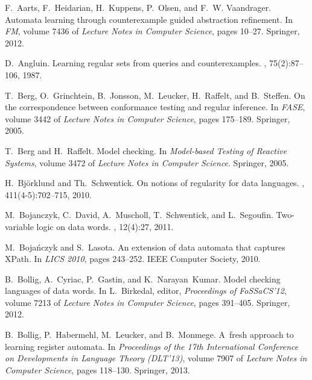 \documentclass{LMCS}
\begin{document}
\def\Nst#1{$#1^{st}$}\def\Nnd#1{$#1^{nd}$}\def\Nrd#1{$#1^{rd}$}\def\Nth#1{$#1^{th}$}
\begin{thebibliography}{10}

F.~Aarts, F.~Heidarian, H.~Kuppens, P.~Olsen, and F.~W. Vaandrager.
\newblock Automata learning through counterexample guided abstraction
  refinement.
\newblock In {\em FM}, volume 7436 of {\em Lecture Notes in Computer Science},
  pages 10--27. Springer, 2012.

D.~Angluin.
\newblock Learning regular sets from queries and counterexamples.
, 75(2):87--106, 1987.

T.~Berg, O.~Grinchtein, B.~Jonsson, M.~Leucker, H.~Raffelt, and B.~Steffen.
\newblock On the correspondence between conformance testing and regular
  inference.
\newblock In {\em FASE}, volume 3442 of {\em Lecture Notes in Computer
  Science}, pages 175--189. Springer, 2005.

T.~Berg and H.~Raffelt.
\newblock Model checking.
\newblock In {\em Model-based Testing of Reactive Systems}, volume 3472 of {\em
  Lecture Notes in Computer Science}. Springer, 2005.

H.~Bj{\"o}rklund and {\relax Th}.~Schwentick.
\newblock On notions of regularity for data languages.
, 411(4-5):702--715, 2010.

M.~Bojanczyk, C.~David, A.~Muscholl, T.~Schwentick, and L.~Segoufin.
\newblock Two-variable logic on data words.
, 12(4):27, 2011.

M.~Boja{\'n}czyk and S.~Lasota.
\newblock An extension of data automata that captures {XPath}.
\newblock In {\em {LICS 2010}}, pages 243--252. IEEE Computer Society, 2010.

B.~Bollig, A.~Cyriac, P.~Gastin, and K.~Narayan~Kumar.
\newblock Model checking languages of data words.
\newblock In L.~Birkedal, editor, {\em {P}roceedings of {FoSSaCS}'12}, volume
  7213 of {\em Lecture Notes in Computer Science}, pages 391--405. Springer,
  2012.

B.~Bollig, P.~Habermehl, M.~Leucker, and B.~Monmege.
\newblock A~fresh approach to learning register automata.
\newblock In {\em {P}roceedings of the 17th {I}nternational {C}onference on
  {D}evelopments in {L}anguage {T}heory ({DLT}'13)}, volume 7907 of {\em
  Lecture Notes in Computer Science}, pages 118--130. Springer, 2013.


\end{thebibliography}
\end{document}
